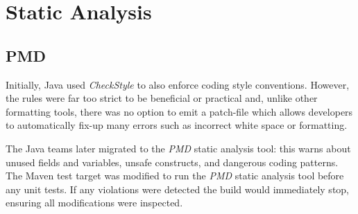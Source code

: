 \section{Static Analysis}
\subsection{PMD}
\par
Initially, Java used \textit{CheckStyle} to also enforce coding style conventions. However, the rules were far too strict to be beneficial or practical and, unlike other formatting tools, there was no option to emit a patch-file which allows developers to automatically fix-up many errors such as incorrect white space or formatting.

\par
The Java teams later migrated to the \textit{PMD}\cite{PMD} static analysis tool: this warns about unused fields and variables, unsafe constructs, and dangerous coding patterns.
The Maven test target was modified to run the \textit{PMD}\cite{PMD} static analysis tool before any unit tests. If any violations were detected the build would immediately stop, ensuring all modifications were inspected.